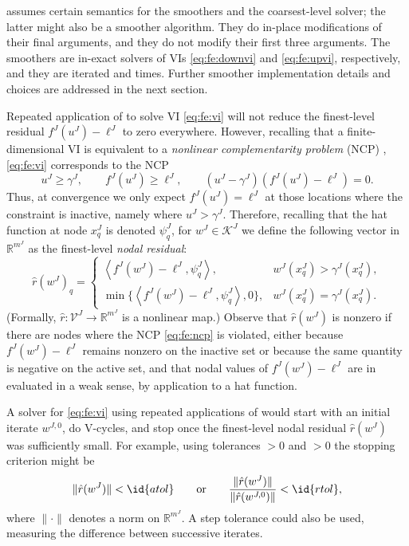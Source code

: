 \documentclass[letterpaper,final,12pt,reqno]{amsart}
\theoremstyle{cstyle}
\theoremstyle{cstyle*}
\theoremstyle{dstyle}
\numberwithin{equation}{section}
\numberwithin{figure}{section}
\numberwithin{table}{section}
\numberwithin{theorem}{section}
\newcommand{\RR}{\mathbb{R}}
\newcommand{\ip}[2]{\left<#1,#2\right>}
\begin{document}
 assumes certain semantics for the smoothers and the coarsest-level solver; the latter might also be a smoother algorithm.  They do in-place modifications of their final arguments, and they do not modify their first three arguments.  The smoothers are in-exact solvers of VIs \eqref{eq:fe:downvi} and \eqref{eq:fe:upvi}, respectively, and they are iterated  and  times.  Further smoother implementation details and choices are addressed in the next section.

Repeated application of  to solve VI \eqref{eq:fe:vi} will not reduce the finest-level residual $f^J(u^J) - \ell^J$ to zero everywhere.  However, recalling that a finite-dimensional VI is equivalent to a \emph{nonlinear complementarity problem} (NCP) \cite{FacchineiPang2003}, \eqref{eq:fe:vi} corresponds to the NCP
\begin{equation}
u^J \ge \gamma^J, \qquad f^J(u^J) \ge \ell^J, \qquad (u^J - \gamma^J)\left(f^J(u^J) - \ell^J\right) = 0.  \label{eq:fe:ncp}
\end{equation}
Thus, at convergence we only expect $f^J(u^J) = \ell^J$ at those locations where the constraint is inactive, namely where $u^J > \gamma^J$.  Therefore, recalling that the hat function at node $x_q^J$ is denoted $\psi_q^J$, for $w^J \in \mathcal{K}^J$ we define the following vector in $\RR^{m^J}$ as the finest-level \emph{nodal residual}:
\begin{equation}
\hat r(w^J)_q = \begin{cases} \ip{f^J(w^J)-\ell^J}{\psi_q^J}, & w^J(x_q^J) > \gamma^J(x_q^J), \\
                                  \min\{\ip{f^J(w^J)-\ell^J}{\psi_q^J},0\}, & w^J(x_q^J) = \gamma^J(x_q^J). \end{cases} \label{eq:cpresidual}
\end{equation}
(Formally, $\hat r:\mathcal{V}^J \to \RR^{m^J}$ is a nonlinear map.)  Observe that $\hat r(w^J)$ is nonzero if there are nodes where the NCP \eqref{eq:fe:ncp} is violated, either because $f^J(w^J)-\ell^J$ remains nonzero on the inactive set or because the same quantity is negative on the active set, and that nodal values of $f^J(w^J)-\ell^J$ are in evaluated in a weak sense, by application to a hat function.

A solver for \eqref{eq:fe:vi} using repeated applications of  would start with an initial iterate $w^{J,0}$, do V-cycles, and stop once the finest-level nodal residual $\hat r(w^J)$ was sufficiently small.  For example, using tolerances $>0$ and $>0$ the stopping criterion might be
\begin{equation}
\|\hat r(w^J)\| < \id{atol} \qquad \text{or} \qquad \frac{\|\hat r(w^J)\|}{\|\hat r(w^{J,0})\|} < \id{rtol},
\end{equation}
where $\|\cdot\|$ denotes a norm on $\RR^{m^J}$.  A step tolerance could also be used, measuring the difference between successive iterates.
\end{document}
